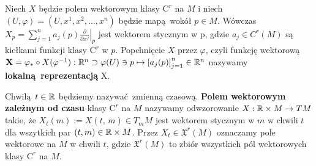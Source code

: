 

Niech \(X\) będzie polem wektorowym klasy \(\mathrm{C}^r\) na \(M\) i niech \((U, \varphi) = (U, x^1, x^2, \dots, x^n)\) będzie mapą wokół \(p\in M\). Wówczas \(X_p = \sum_{j=1}^{n}a_j(p)\left.\frac{\partial}{\partial x^j}\right|_p\) jest wektorem stycznym w p, gdzie \(a_j\in C^r(M)\) są kiełkami funkcji klasy \(\mathrm{C}^r\) w \(p\). Popchnięcie \(X\) przez \(\varphi\), czyli funkcję wektorową \(\mathbf{X} = \varphi_{\ast}\circ X(\varphi^{-1}): \mathbb{R}^n \supset \varphi(U)\ni p \mapsto \left[a_j(p)\right]_{j=1}^n\in \mathbb{R}^n\) nazywamy \textbf{lokalną reprezentacją} X.

\begin{figure}[!h]
\centering
{}
\end{figure}

Chwilą \(t\in\mathbb{R}\) będziemy nazywać zmienną czasową. \textbf{Polem wektorowym zależnym od czasu} klasy \(\mathrm{C}^r\) na \(M\) nazywamy odwzorowanie \(X:\mathbb{R}\times M\rightarrow TM\) takie, że \(X_t(m):=X(t,\,m) \in T_{m} M\) jest wektorem stycznym w \(m\) w chwili \(t\) dla wszytkich par \((t, m) \in \mathbb{R} \times M\). Przez \(X_t\in \mathfrak{X}^r(M)\) oznaczamy pole wektorowe na \(M\) w chwili \(t\), gdzie \(\mathfrak{X}^r(M)\) to zbiór wszystkich pól wektorowych klasy \(\mathrm{C}^r\) na \(M\). 


